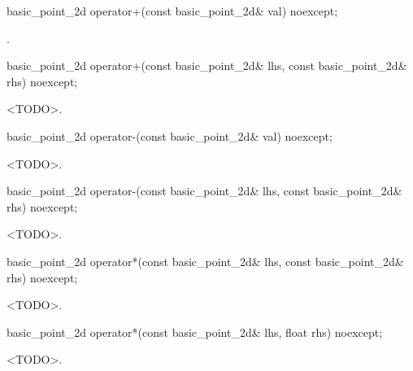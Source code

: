 %
\begin{itemdecl}
basic_point_2d operator+(const basic_point_2d& val) noexcept;
\end{itemdecl}
\begin{itemdescr}
\pnum
\returns
{}.
\end{itemdescr}

%
\begin{itemdecl}
basic_point_2d operator+(const basic_point_2d& lhs, const basic_point_2d& rhs) noexcept;
\end{itemdecl}
\begin{itemdescr}
\pnum
\returns
<TODO>.
\end{itemdescr}

%
\begin{itemdecl}
basic_point_2d operator-(const basic_point_2d& val) noexcept;
\end{itemdecl}
\begin{itemdescr}
\pnum
\returns
<TODO>.
\end{itemdescr}

%
\begin{itemdecl}
basic_point_2d operator-(const basic_point_2d& lhs, const basic_point_2d& rhs) noexcept;
\end{itemdecl}
\begin{itemdescr}
\pnum
\returns
<TODO>.
\end{itemdescr}

%
\begin{itemdecl}
basic_point_2d operator*(const basic_point_2d& lhs, const basic_point_2d& rhs) noexcept;
\end{itemdecl}
\begin{itemdescr}
\pnum
\returns
<TODO>.
\end{itemdescr}

%
\begin{itemdecl}
basic_point_2d operator*(const basic_point_2d& lhs, float rhs) noexcept;
\end{itemdecl}
\begin{itemdescr}
\pnum
\returns
<TODO>.
\end{itemdescr}

